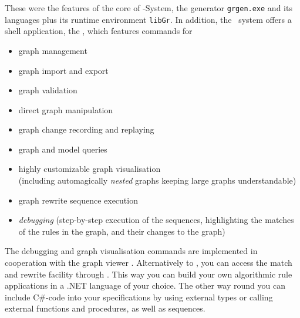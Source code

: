\noindent These were the features of the core of \GrG-System,
the generator \texttt{grgen.exe} and its languages plus its runtime environment \texttt{libGr}.
In addition, the \GrG\ system offers a shell application, the \GrShell,
which features commands for
\begin{itemize}
	\item graph management
	\item graph import and export
	\item graph validation
	\item direct graph manipulation
	\item graph change recording and replaying
	\item graph and model queries
	\item highly customizable graph visualisation\\(including automagically \emph{nested} graphs keeping large graphs understandable)
	\item graph rewrite sequence execution
	\item \emph{debugging} (step-by-step execution of the sequences, highlighting the matches of the rules  in the graph, and their changes to the graph)
\end{itemize}

\noindent The debugging and graph visualisation commands are implemented in cooperation with the graph viewer \yComp.
Alternatively to \GrShell, you can access the match and rewrite facility through \LibGr.
This way you can build your own algorithmic rule applications in a .NET language of your choice.
The other way round you can include C\#-code into your specifications by using external types or calling external functions and procedures, as well as sequences.


